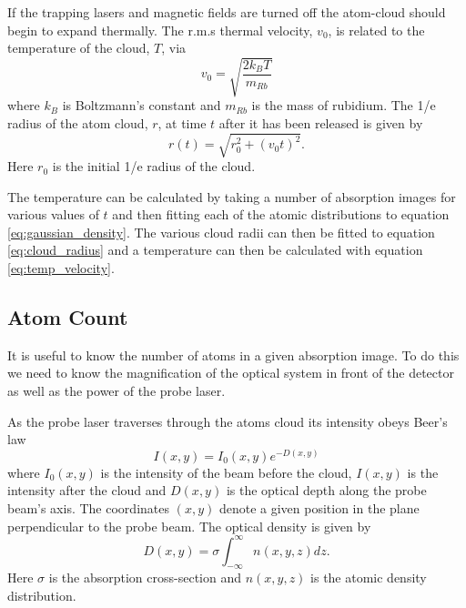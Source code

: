 If the trapping lasers and magnetic fields are turned off the atom-cloud should begin to expand thermally. The r.m.s thermal velocity, $v_0$, is related to the temperature of the cloud, $T$, via \cite{sheludko_shaped_2010}
\begin{equation}\label{eq:temp_velocity}
v_0 = \sqrt{\frac{2k_BT}{m_{Rb}}}
\end{equation}
where $k_B$ is Boltzmann's constant and $m_{Rb}$ is the mass of rubidium. The 1/e radius of the atom cloud, $r$, at time $t$ after it has been released is given by
\begin{equation}\label{eq:cloud_radius}
r(t) = \sqrt{r_0^2 + (v_0t)^2}.
\end{equation}
Here $r_0$ is the initial 1/e radius of the cloud.

The temperature can be calculated by taking a number of absorption images for various values of $t$ and then fitting each of the atomic distributions to equation \ref{eq:gaussian_density}. The various cloud radii can then be fitted to equation \ref{eq:cloud_radius} and a temperature can then be calculated with equation \ref{eq:temp_velocity}.

\subsection{Atom Count}


It is useful to know the number of atoms in a given absorption image. To do this we need to know the magnification of the optical system in front of the detector as well as the power of the probe laser.

As the probe laser traverses through the atoms cloud its intensity obeys Beer's law\cite{foot_atomic_2005}
\begin{equation}\label{eq:beers_law}
I(x, y) = I_0(x, y)e^{-D(x, y)}
\end{equation}
where $I_0(x, y)$ is the intensity of the beam before the cloud, $I(x, y)$ is the intensity after the cloud and $D(x, y)$ is the optical depth along the probe beam's axis. The coordinates $(x, y)$ denote a given position in the plane perpendicular to the probe beam. The optical density is given by
\begin{equation}\label{eq:optical_density}
D(x, y) = \sigma \int_{-\infty}^{\infty}n(x, y, z)dz.
\end{equation}
Here $\sigma$ is the absorption cross-section and $n(x, y, z)$ is the atomic density distribution.

